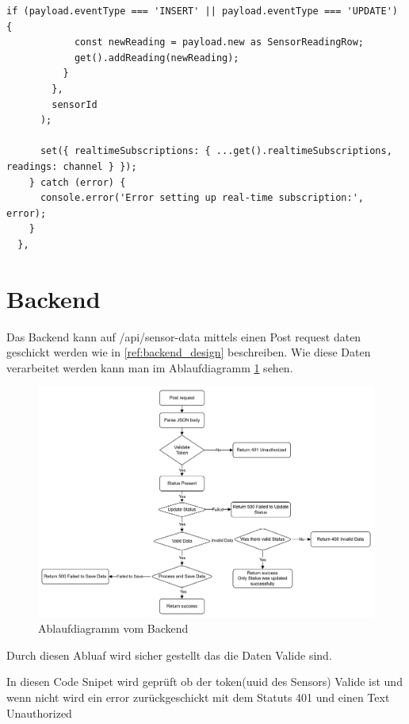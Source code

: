 \begin{inhalt}
\begin{enumerate}[label=\textbf{\arabic*.}]
\begin{lstlisting}[language=mytsx]
          if (payload.eventType === 'INSERT' || payload.eventType === 'UPDATE') {
            const newReading = payload.new as SensorReadingRow;
            get().addReading(newReading);
          }
        },
        sensorId
      );
      
      set({ realtimeSubscriptions: { ...get().realtimeSubscriptions, readings: channel } });
    } catch (error) {
      console.error('Error setting up real-time subscription:', error);
    }
  },
\end{lstlisting}






\newpage

\section{Backend}

Das Backend kann auf /api/sensor-data mittels einen Post request daten geschickt werden wie in \ref{ref:backend_design} beschreiben. Wie diese Daten verarbeitet werden kann man im Ablaufdiagramm \ref{fig:Flowchart_Backend} sehen.

\begin{figure}[!htb]
\centering
\includegraphics[width=1\textwidth]{files/Thomas/pics/Website/backend/image.png}
\caption[Ablaufdiagramm vom Backend]{Ablaufdiagramm vom Backend}
\label{fig:Flowchart_Backend}
\end{figure}

Durch diesen Abluaf wird sicher gestellt das die Daten Valide sind.

\newpage

In diesen Code Snipet wird geprüft ob der token(uuid des Sensors) Valide ist und wenn nicht wird ein error zurückgeschickt mit dem Statuts 401 und einen Text Unauthorized


\end{enumerate}
\end{inhalt}
